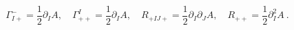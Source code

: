 \begin{equation}
\Gamma^-_{I+} = \frac{1}{2} \partial_I A,\quad
\Gamma^I_{++} = \frac{1}{2} \partial_I A,\quad
R_{+IJ+} = \frac{1}{2} \partial_I \partial_J A, \quad
R_{++} = \frac{1}{2} \partial^2_I A ~.
\label{CC}
\end{equation}

